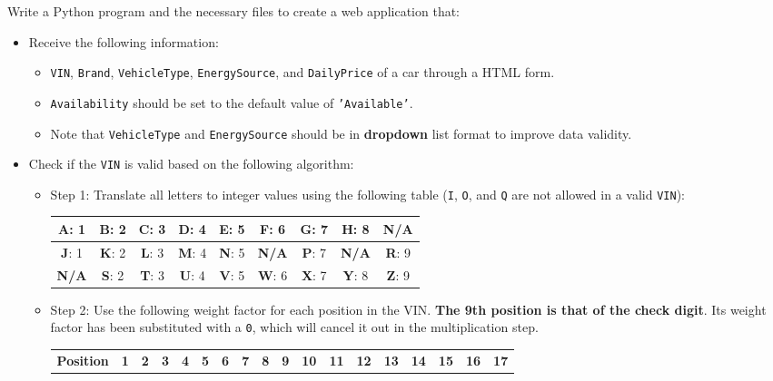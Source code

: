 Write a Python program and the necessary files to create a web application
that: 
\begin{itemize}
\item Receive the following information: 
\begin{itemize}
\item \texttt{VIN}, \texttt{Brand}, \texttt{VehicleType}, \texttt{EnergySource},
and \texttt{DailyPrice} of a car through a HTML form.
\item \texttt{Availability} should be set to the default value of \texttt{'Available'}. 
\item Note that \texttt{VehicleType} and \texttt{EnergySource} should be
in \textbf{dropdown} list format to improve data validity. 
\end{itemize}
\item Check if the \texttt{VIN} is valid based on the following algorithm: 
\begin{itemize}
\item Step 1: Translate all letters to integer values using the following
table (\texttt{I}, \texttt{O}, and \texttt{Q} are not allowed in a
valid \texttt{VIN}): 
\noindent \begin{center}
\begin{tabular}{|c|c|c|c|c|c|c|c|c|}
\hline 
\textbf{A}: 1  & \textbf{B}: 2  & \textbf{C}: 3  & \textbf{D}: 4  & \textbf{E}: 5  & \textbf{F}: 6  & \textbf{G}: 7  & \textbf{H}: 8  & \textbf{N/A}\tabularnewline
\hline 
\textbf{J}: 1  & \textbf{K}: 2  & \textbf{L}: 3  & \textbf{M}: 4  & \textbf{N}: 5  & \textbf{N/A}  & \textbf{P}: 7  & \textbf{N/A } & \textbf{R}: 9\tabularnewline
\hline 
\textbf{N/A}  & \textbf{S}: 2  & \textbf{T}: 3  & \textbf{U}: 4  & \textbf{V}: 5  & \textbf{W}: 6  & \textbf{X}: 7  & \textbf{Y}: 8 & \textbf{Z}: 9\tabularnewline
\hline 
\end{tabular}
\par\end{center}
\item Step 2: Use the following weight factor for each position in the VIN.
\textbf{The 9th position is that of the check digit}. Its weight factor
has been substituted with a \texttt{0}, which will cancel it out in
the multiplication step. 
\noindent \begin{center}
\begin{tabular}{|c|c|c|c|c|c|c|c|c|c|c|c|c|c|c|c|c|c|}
\hline 
\textbf{Position } & \textbf{1 } & \textbf{2 } & \textbf{3} & \textbf{4} & \textbf{5} & \textbf{6} & \textbf{7} & \textbf{8} & \textbf{9} & \textbf{10} & \textbf{11} & \textbf{12} & \textbf{13} & \textbf{14} & \textbf{15} & \textbf{16} & \textbf{17}\tabularnewline

\end{tabular}
\end{center}
\end{itemize}
\end{itemize}
